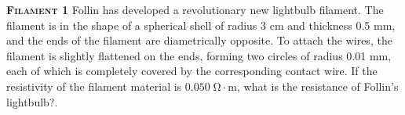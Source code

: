 \begin{problem}{\textbf{\textsc{Filament 1}}\hspace{1mm}}
Follin has developed a revolutionary new lightbulb filament. The filament is in the shape of a spherical shell of radius 3 cm and thickness 0.5 mm, and the ends of the filament are diametrically opposite. To attach the wires, the filament is slightly flattened on the ends, forming two circles of radius 0.01 mm, each of which is completely covered by the corresponding contact wire. If the resistivity of the filament material is $0.050\;\mathrm{\Omega\cdot m}$, what is the resistance of Follin's lightbulb?.
\end{problem}